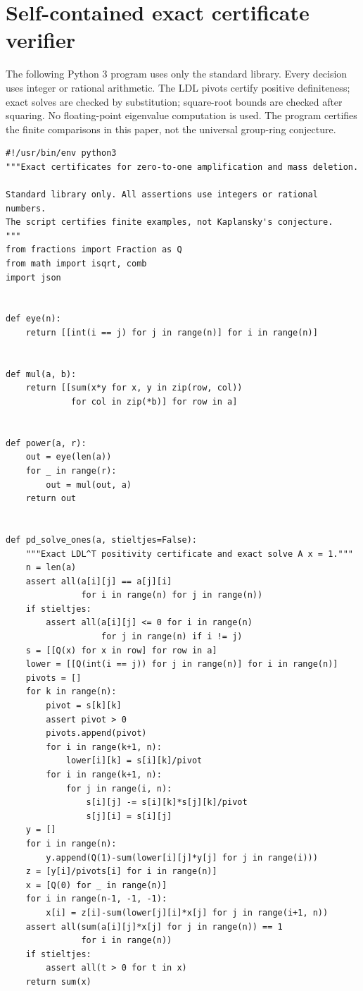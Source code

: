 \documentclass[11pt,a4paper,oneside]{report}
\theoremstyle{definition}
\theoremstyle{remark}
\begin{document}
\begingroup\raggedright

\endgroup


\section{Self-contained exact certificate verifier}
\label{M05:app:verifier}

The following Python 3 program uses only the standard library.
Every decision uses integer or rational arithmetic. The LDL
pivots certify positive definiteness; exact solves are checked by
substitution; square-root bounds are checked after squaring.
No floating-point eigenvalue computation is used. The program
certifies the finite comparisons in this paper, not the universal
group-ring conjecture.

\begin{lstlisting}
#!/usr/bin/env python3
"""Exact certificates for zero-to-one amplification and mass deletion.

Standard library only. All assertions use integers or rational numbers.
The script certifies finite examples, not Kaplansky's conjecture.
"""
from fractions import Fraction as Q
from math import isqrt, comb
import json


def eye(n):
    return [[int(i == j) for j in range(n)] for i in range(n)]


def mul(a, b):
    return [[sum(x*y for x, y in zip(row, col))
             for col in zip(*b)] for row in a]


def power(a, r):
    out = eye(len(a))
    for _ in range(r):
        out = mul(out, a)
    return out


def pd_solve_ones(a, stieltjes=False):
    """Exact LDL^T positivity certificate and exact solve A x = 1."""
    n = len(a)
    assert all(a[i][j] == a[j][i]
               for i in range(n) for j in range(n))
    if stieltjes:
        assert all(a[i][j] <= 0 for i in range(n)
                   for j in range(n) if i != j)
    s = [[Q(x) for x in row] for row in a]
    lower = [[Q(int(i == j)) for j in range(n)] for i in range(n)]
    pivots = []
    for k in range(n):
        pivot = s[k][k]
        assert pivot > 0
        pivots.append(pivot)
        for i in range(k+1, n):
            lower[i][k] = s[i][k]/pivot
        for i in range(k+1, n):
            for j in range(i, n):
                s[i][j] -= s[i][k]*s[j][k]/pivot
                s[j][i] = s[i][j]
    y = []
    for i in range(n):
        y.append(Q(1)-sum(lower[i][j]*y[j] for j in range(i)))
    z = [y[i]/pivots[i] for i in range(n)]
    x = [Q(0) for _ in range(n)]
    for i in range(n-1, -1, -1):
        x[i] = z[i]-sum(lower[j][i]*x[j] for j in range(i+1, n))
    assert all(sum(a[i][j]*x[j] for j in range(n)) == 1
               for i in range(n))
    if stieltjes:
        assert all(t > 0 for t in x)
    return sum(x)



\end{lstlisting}
\end{document}
